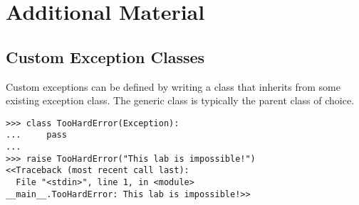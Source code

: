 \begin{problem}
\begin{comment}
Examples:

\begin{lstlisting}
# example.txt
a b c
d e f
\end{lstlisting}

\begin{lstlisting}
>>> cf = ContentFilter("example.txt")

>>> cf.uniform("uniform.txt", mode='w', case="upper")
>>> cf.uniform("uniform.txt", mode='a', case="lower")

>>> cf.reverse("reverse.txt", mode='w', unit="word")
>>> cf.reverse("reverse.txt", mode='a', unit="line")

>>> cf.transpose("transpose.txt", mode='w')
\end{lstlisting}

\begin{lstlisting}
# uniform.txt
A B C
D E F
a b c
d e f
\end{lstlisting}

\begin{lstlisting}
# reverse.txt
c b a
f e d
d e f
a b c
\end{lstlisting}

\begin{lstlisting}
a d
b e
c f
\end{lstlisting}
\end{comment}

\label{prob:content-filter-methods}
\end{problem}

\newpage

\section*{Additional Material} %

\subsection*{Custom Exception Classes} %

Custom exceptions can be defined by writing a class that inherits from some existing exception class.
The generic  class is typically the parent class of choice.

\begin{lstlisting}
>>> class TooHardError(Exception):
...     pass
...
>>> raise TooHardError("This lab is impossible!")
<<Traceback (most recent call last):
  File "<stdin>", line 1, in <module>
__main__.TooHardError: This lab is impossible!>>
\end{lstlisting}

